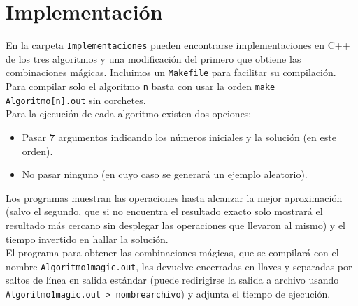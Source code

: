 \section{Implementación}

En la carpeta \texttt{Implementaciones} pueden encontrarse implementaciones
en C++ de los tres algoritmos y una modificación del primero que obtiene las
combinaciones mágicas. Incluimos un \texttt{Makefile} para facilitar
su compilación.
Para compilar solo el algoritmo \texttt{n} basta con usar la orden
\texttt{make Algoritmo[n].out} sin corchetes.\\

Para la ejecución de cada algoritmo existen dos opciones:

\begin{itemize}
  \item Pasar \textbf{7} argumentos indicando los números iniciales y la
  solución (en este orden).
  \item No pasar ninguno (en cuyo caso se generará un ejemplo aleatorio).
\end{itemize}

Los programas muestran las operaciones hasta alcanzar la mejor aproximación
(salvo el segundo, que si no encuentra el resultado exacto solo mostrará
el resultado más cercano sin desplegar las operaciones que llevaron al
mismo) y el tiempo invertido en hallar la solución. \\

El programa para obtener las combinaciones mágicas, que se compilará con
el nombre \texttt{Algoritmo1magic.out}, las devuelve encerradas en llaves
y separadas por saltos de línea en salida estándar (puede redirigirse la
salida a archivo usando \texttt{Algoritmo1magic.out\ >\ nombrearchivo})
y adjunta el tiempo de ejecución.
